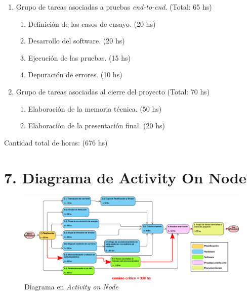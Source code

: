 \documentclass[11pt]{charter}
\begin{document}
\begin{enumerate}
	\item Grupo de tareas asociadas a pruebas \textit{end-to-end}. (Total: 65 hs)
		\begin{enumerate}
		 	\item Definición de los casos de ensayo. (20 hs)
		 	\item Desarrollo del software. (20 hs)
		 	\item Ejecución de las pruebas. (15 hs)
		 	\item Depuración de errores. (10 hs)
		\end{enumerate}		

	\item Grupo de tareas asociadas al cierre del proyecto (Total: 70 hs)
		\begin{enumerate}
			\item Elaboración de la memoria técnica. (50 hs)
			\item Elaboración de la presentación final. (20 hs)
		\end{enumerate}
	\end{enumerate}
	
Cantidad total de horas: (676 hs)


\section{7. Diagrama de Activity On Node}
\label{sec:AoN}
\begin{figure}[htpb]
	\centering 
	\includegraphics[width=\textwidth]{./Figuras/activity_on_node/version_compacta/aon.png}
	\caption{Diagrama en \textit{Activity on Node}}
	\label{fig:AoN}
\end{figure}
\end{document}
